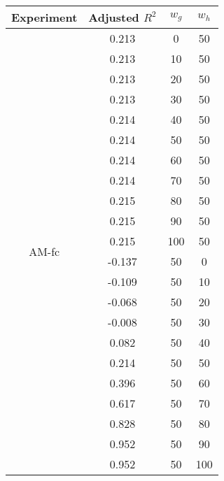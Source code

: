 \documentclass{article}
\begin{document}
\begin{table}[h]
  \centering
  \begin{tabular}{c c c c}
    \toprule
    Experiment                & Adjusted $R^2$ & $w_g$ & $w_h$ \\
    \midrule
    \multirow{22}{*}{AM-fc} & 0.213 & 0 & 50 \\
                              & 0.213 & 10  & 50 \\
                              & 0.213 & 20  & 50 \\
                              & 0.213 & 30  & 50 \\
                              & 0.214 & 40  & 50 \\
                              & 0.214 & 50  & 50 \\
                              & 0.214 & 60  & 50 \\
                              & 0.214 & 70  & 50 \\
                              & 0.215 & 80  & 50 \\
                              & 0.215 & 90  & 50 \\
                              & 0.215 & 100 & 50 \\
                              & -0.137  & 50  & 0 \\
                              & -0.109  & 50  & 10 \\
                              & -0.068  & 50  & 20 \\
                              & -0.008  & 50  & 30 \\
                              & 0.082 & 50  & 40 \\
                              & 0.214 & 50  & 50 \\
                              & 0.396 & 50  & 60 \\
                              & 0.617 & 50  & 70 \\
                              & 0.828 & 50  & 80 \\
                              & 0.952 & 50  & 90 \\
                              & 0.952 & 50  & 100 \\
    \bottomrule
  \end{tabular}
\end{table}
\end{document}
